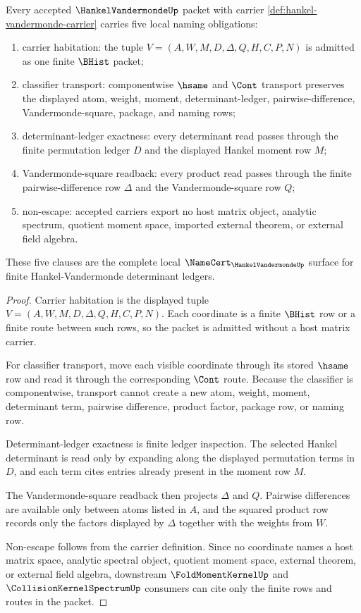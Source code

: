 \begin{theorem}
\label{thm:hankel-vandermonde-namecert-obligations}
Every accepted $\HankelVandermondeUp$ packet with carrier \autoref{def:hankel-vandermonde-carrier} carries five local naming obligations:
\begin{enumerate}
\item carrier habitation: the tuple $V=(A,W,M,D,\Delta,Q,H,C,P,N)$ is admitted as one finite $\BHist$ packet;
\item classifier transport: componentwise $\hsame$ and $\Cont$ transport preserves the displayed atom, weight, moment, determinant-ledger, pairwise-difference, Vandermonde-square, package, and naming rows;
\item determinant-ledger exactness: every determinant read passes through the finite permutation ledger $D$ and the displayed Hankel moment row $M$;
\item Vandermonde-square readback: every product read passes through the finite pairwise-difference row $\Delta$ and the Vandermonde-square row $Q$;
\item non-escape: accepted carriers export no host matrix object, analytic spectrum, quotient moment space, imported external theorem, or external field algebra.
\end{enumerate}
These five clauses are the complete local $\NameCert_{\HankelVandermondeUp}$ surface for finite Hankel-Vandermonde determinant ledgers.
\end{theorem}
\begin{proof}
Carrier habitation is the displayed tuple $V=(A,W,M,D,\Delta,Q,H,C,P,N)$. Each coordinate is a finite $\BHist$ row or a finite route between such rows, so the packet is admitted without a host matrix carrier.

For classifier transport, move each visible coordinate through its stored $\hsame$ row and read it through the corresponding $\Cont$ route. Because the classifier is componentwise, transport cannot create a new atom, weight, moment, determinant term, pairwise difference, product factor, package row, or naming row.

Determinant-ledger exactness is finite ledger inspection. The selected Hankel determinant is read only by expanding along the displayed permutation terms in $D$, and each term cites entries already present in the moment row $M$.

The Vandermonde-square readback then projects $\Delta$ and $Q$. Pairwise differences are available only between atoms listed in $A$, and the squared product row records only the factors displayed by $\Delta$ together with the weights from $W$.

Non-escape follows from the carrier definition. Since no coordinate names a host matrix space, analytic spectral object, quotient moment space, external theorem, or external field algebra, downstream $\FoldMomentKernelUp$ and $\CollisionKernelSpectrumUp$ consumers can cite only the finite rows and routes in the packet.
\end{proof}

